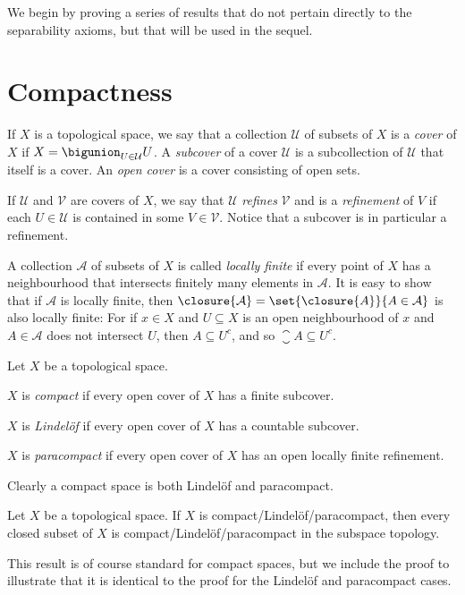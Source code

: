 \documentclass[article, a4paper, 11pt, oneside]{memoir}
\numberwithin{equation}{chapter}
\newcommand{\calU}{\mathcal{U}}
\newcommand{\calV}{\mathcal{V}}
\begin{document}
We begin by proving a series of results that do not pertain directly to the separability axioms, but that will be used in the sequel.


\section{Compactness}

\newcommand{\calA}{\mathcal{A}}

If $X$ is a topological space, we say that a collection $\calU$ of subsets of $X$ is a \emph{cover} of $X$ if $X = \bigunion_{U \in \calU} U$. A \emph{subcover} of a cover $\calU$ is a subcollection of $\calU$ that itself is a cover. An \emph{open cover} is a cover consisting of open sets.

If $\calU$ and $\calV$ are covers of $X$, we say that $\calU$ \emph{refines} $\calV$ and is a \emph{refinement} of $V$ if each $U \in \calU$ is contained in some $V \in \calV$. Notice that a subcover is in particular a refinement.

A collection $\calA$ of subsets of $X$ is called \emph{locally finite} if every point of $X$ has a neighbourhood that intersects finitely many elements in $\calA$. It is easy to show that if $\calA$ is locally finite, then $\closure{\calA} = \set{\closure{A}}{A \in \calA}$ is also locally finite: For if $x \in X$ and $U \subseteq X$ is an open neighbourhood of $x$ and $A \in \calA$ does not intersect $U$, then $A \subseteq U^c$, and so $\closure{A} \subseteq U^c$.

\begin{definition}
    Let $X$ be a topological space.
    \begin{enumdef}
        \item $X$ is \emph{compact} if every open cover of $X$ has a finite subcover.

        \item $X$ is \emph{Lindelöf} if every open cover of $X$ has a countable subcover.

        \item $X$ is \emph{paracompact} if every open cover of $X$ has an open locally finite refinement.
    \end{enumdef}
\end{definition}
%
Clearly a compact space is both Lindelöf and paracompact.


\begin{proposition}
    \label{thm:compact-Lindelof-closed-subset}
    Let $X$ be a topological space. If $X$ is compact/Lindelöf/paracompact, then every closed subset of $X$ is compact/Lindelöf/paracompact in the subspace topology.
\end{proposition}
%
This result is of course standard for compact spaces, but we include the proof to illustrate that it is identical to the proof for the Lindelöf and paracompact cases.
\end{document}
